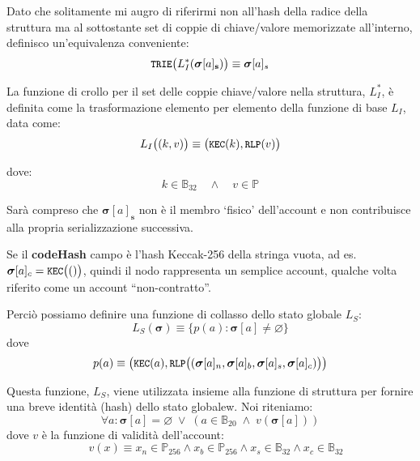 \documentclass[9pt,oneside]{amsart}
\begin{document}
\begin{multicols}{2}
Dato che solitamente mi augro di riferirmi non all'hash della radice della struttura ma al sottostante set di coppie di chiave/valore memorizzate all'interno, definisco un'equivalenza conveniente:
\begin{equation}
\texttt{\small TRIE}\big(L_I^*(\boldsymbol{\sigma}[a]_\mathbf{s})\big) \equiv \boldsymbol{\sigma}[a]_s
\end{equation}

La funzione di crollo per il set delle coppie chiave/valore nella struttura, $L_I^*$, è definita come la trasformazione elemento per elemento della funzione di base $L_I$, data come:
\begin{equation}
L_I\big( (k, v) \big) \equiv \big(\texttt{\small KEC}(k), \texttt{\small RLP}(v)\big)
\end{equation}

dove:
\begin{equation}
k \in \mathbb{B}_{32} \quad \wedge \quad v \in \mathbb{P}
\end{equation}

Sarà compreso che $\boldsymbol{\sigma}[a]_\mathbf{s}$ non è il membro `fisico' dell'account e non contribuisce alla propria serializzazione successiva.

Se il \textbf{codeHash} campo è l'hash Keccak-256 della stringa vuota, ad es. $\boldsymbol{\sigma}[a]_c = \texttt{\small KEC}\big(()\big)$, quindi il nodo rappresenta un semplice account, qualche volta riferito come un account ``non-contratto''.

Perciò possiamo definire una funzione di collasso dello stato globale $L_S$:
\begin{equation}
L_S(\boldsymbol{\sigma}) \equiv \{ p(a): \boldsymbol{\sigma}[a] \neq \varnothing \}
\end{equation}
dove
\begin{equation}
p(a) \equiv  \big(\texttt{\small KEC}(a), \texttt{\small RLP}\big( (\boldsymbol{\sigma}[a]_n, \boldsymbol{\sigma}[a]_b, \boldsymbol{\sigma}[a]_s, \boldsymbol{\sigma}[a]_c) \big) \big)
\end{equation}

Questa funzione, $L_S$, viene utilizzata insieme alla funzione di struttura per fornire una breve identità (hash) dello stato globalew. Noi riteniamo:
\begin{equation}
\forall a: \boldsymbol{\sigma}[a] = \varnothing \; \vee \; (a \in \mathbb{B}_{20} \; \wedge \; v(\boldsymbol{\sigma}[a]))
\end{equation}
dove $v$ è la funzione di validità dell'account:
\begin{equation}
\quad v(x) \equiv x_n \in \mathbb{P}_{256} \wedge x_b \in \mathbb{P}_{256} \wedge x_s \in \mathbb{B}_{32} \wedge x_c \in \mathbb{B}_{32}
\end{equation}


\end{multicols}
\end{document}
